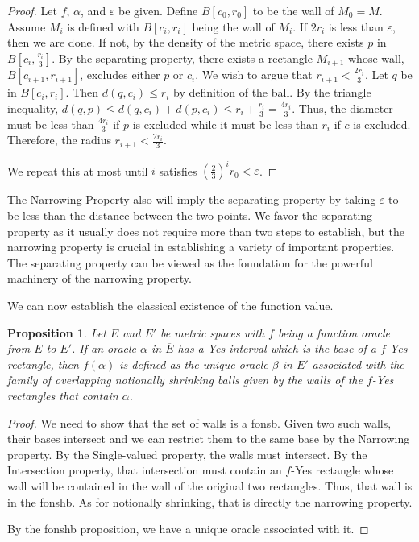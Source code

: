 \documentclass[12pt]{article}
\newtheorem{proposition}{Proposition}
\theoremstyle{remark}
\begin{document}
\begin{proof}
    Let $f$, $\alpha$, and $\varepsilon$ be given. Define $B[c_0, r_0]$ to be the wall of $M_0 =M $. Assume $M_i$ is defined with $B[c_i, r_i]$ being the wall of $M_i$. If $2r_i$ is less than $\varepsilon$, then we are done. If not, by the density of the metric space, there exists $p$ in $B[c_i, \frac{r_i}{3}]$. By the separating property, there exists a rectangle $M_{i+1}$ whose wall, $B[c_{i+1}, r_{i+1}]$, excludes either $ p$ or $c_i$. We wish to argue that $r_{i+1} < \frac{2r_i}{3}$. Let $q$ be in $B[c_i, r_i]$. Then $d(q, c_i) \leq r_i$ by definition of the ball.  By the triangle inequality, $d(q, p) \leq d(q,c_i) + d(p, c_i) \leq r_i + \frac{r_i}{3}= \frac{4 r_i}{3}$. Thus, the diameter must be less than $\frac{4r_i}{3}$ if $p$ is excluded while it must be less than $r_i$ if $c$ is excluded. Therefore, the radius $r_{i+1} < \frac{2r_i}{3}$. 

    We repeat this at most until $i$ satisfies $(\frac{2}{3})^i r_0 < \varepsilon$. 
\end{proof}

The Narrowing Property also will imply the separating property by taking $\varepsilon$ to be less than the distance between the two points. We favor the separating property as it usually does not require more than two steps to establish, but the narrowing property is crucial in establishing a variety of important properties. The separating property can be viewed as the foundation for the powerful machinery of the narrowing property. 

We can now establish the classical existence of the function value.

\begin{proposition}
Let $E$ and $E'$ be metric spaces with $f$ being a function oracle from $E$ to $E'$. If an oracle $\alpha$ in $\overline{E}$ has a Yes-interval which is the base of a $f$-Yes rectangle, then $f(\alpha)$ is defined as the unique oracle $\beta$ in $\overline{E'}$ associated with the family of overlapping notionally shrinking balls given by the walls of the $f$-Yes rectangles that contain $\alpha$. 
\end{proposition}

\begin{proof}
We need to show that the set of walls is a fonsb. Given two such walls, their bases intersect and we can restrict them to the same base by the Narrowing property. By the Single-valued property, the walls must intersect. By the Intersection property, that intersection must contain an $f$-Yes rectangle whose wall will be contained in the wall of the original two rectangles. Thus, that wall is in the fonshb. As for notionally shrinking, that is directly the narrowing property. 

By the fonshb proposition, we have a unique oracle associated with it. 
\end{proof}
\end{document}
